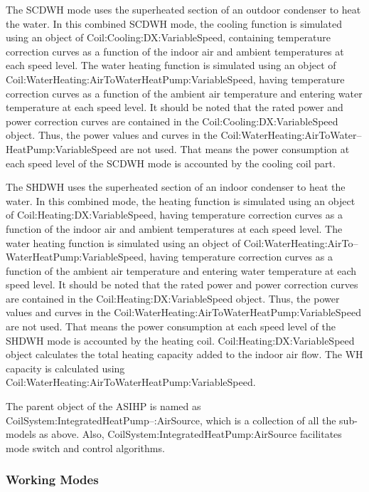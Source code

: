 The SCDWH mode uses the superheated section of an outdoor condenser to heat the water. In this combined SCDWH mode, the cooling function is simulated using an object of Coil:Cooling:DX:VariableSpeed, containing temperature correction curves as a function of the indoor air and ambient temperatures at each speed level. The water heating function is simulated using an object of Coil:WaterHeating:AirToWaterHeatPump:VariableSpeed, having temperature correction curves as a function of the ambient air temperature and entering water temperature at each speed level.  It should be noted that the rated power and power correction curves are contained in the Coil:Cooling:DX:VariableSpeed object. Thus, the power values and curves in the Coil:WaterHeating:AirToWater--HeatPump:VariableSpeed are not used. That means the power consumption at each speed level of the SCDWH mode is accounted by the cooling coil part.

The SHDWH uses the superheated section of an indoor condenser to heat the water. In this combined mode, the heating function is simulated using an object of Coil:Heating:DX:VariableSpeed, having temperature correction curves as a function of the indoor air and ambient temperatures at each speed level. The water heating function is simulated using an object of Coil:WaterHeating:AirTo--WaterHeatPump:VariableSpeed, having temperature correction curves as a function of the ambient air temperature and entering water temperature at each speed level. It should be noted that the rated power and power correction curves are contained in the Coil:Heating:DX:VariableSpeed object. Thus, the power values and curves in the Coil:WaterHeating:AirToWaterHeatPump:VariableSpeed are not used. That means the power consumption at each speed level of the SHDWH mode is accounted by the heating coil. Coil:Heating:DX:VariableSpeed object calculates the total heating capacity added to the indoor air flow. The WH capacity is calculated using Coil:WaterHeating:AirToWaterHeatPump:VariableSpeed.

The parent object of the ASIHP is named as CoilSystem:IntegratedHeatPump--:AirSource, which is a collection of all the sub-models as above. Also, CoilSystem:IntegratedHeatPump:AirSource facilitates mode switch and control algorithms.


\subsubsection{Working Modes}\label{Working-Modes-ASIHP}

